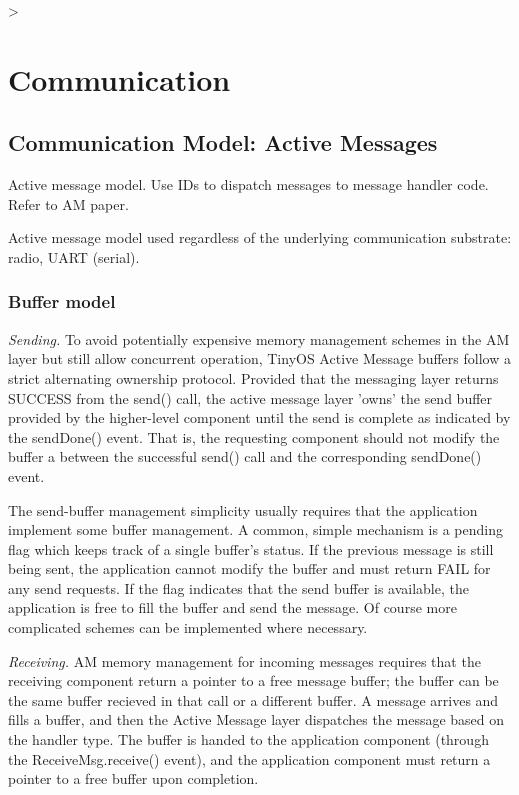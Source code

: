 >
\section{Communication}

\subsection{Communication Model: Active Messages}

Active message model. Use IDs to dispatch messages to message handler
code. Refer to AM paper.

Active message model used regardless of the underlying communication
substrate: radio, UART (serial).

\subsubsection{Buffer model}

\emph{Sending.}
To avoid potentially expensive memory management schemes in the AM
layer but still allow concurrent operation, TinyOS Active Message
buffers follow a strict alternating ownership protocol. Provided that the 
messaging layer returns SUCCESS from the send() call, the active
message layer 'owns' the send buffer provided by the higher-level
component until
the send is complete as indicated by the sendDone() event. That is, 
the requesting component should not modify the buffer a between the
successful send() call and the corresponding sendDone() event. 

The send-buffer management simplicity usually requires that the
application implement some buffer management. A common, simple mechanism is a
pending flag which keeps track of a single buffer's status. If the previous
message is still being sent, the application cannot modify the buffer
and must return FAIL for any send requests.  If the flag indicates
that the send buffer is available, the application is free to fill the
buffer and send the message. Of course more complicated schemes can be
implemented where necessary.

\emph{Receiving.} AM memory management for incoming messages requires
that the receiving component return a pointer to a free message
buffer; the buffer can be the same buffer recieved in that call or a
different buffer. A message arrives and fills a buffer, and then the Active
Message layer dispatches the message based on the handler type. The buffer
is handed to the application component (through the
ReceiveMsg.receive() event), and  the application
component must return a pointer to a free buffer upon completion.

